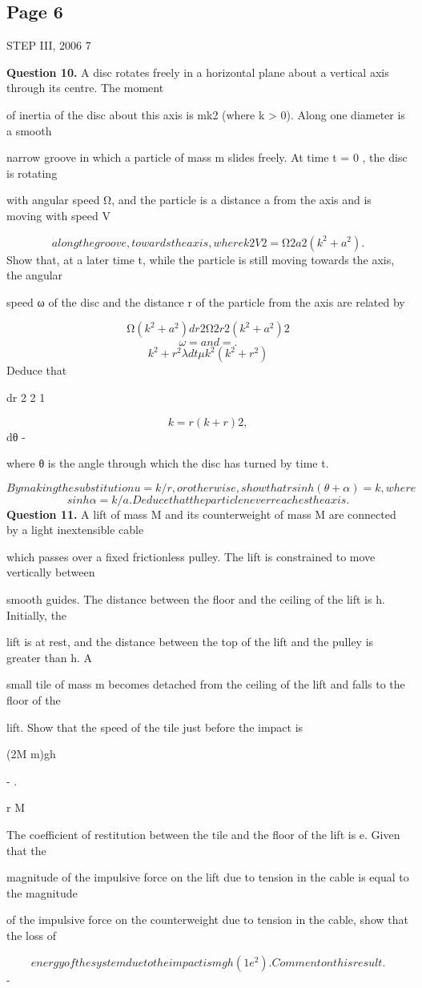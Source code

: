 \documentclass[12pt]{article}
\begin{document}
\subsection*{Page 6}
\begin{flushleft}
STEP III, 2006 7\par
\bigskip\textbf{Question 10.} A disc rotates freely in a horizontal plane about a vertical axis through its centre. The moment\par
of inertia of the disc about this axis is mk2 (where k > 0). Along one diameter is a smooth\par
narrow groove in which a particle of mass m slides freely. At time t = 0 , the disc is rotating\par
with angular speed Ω, and the particle is a distance a from the axis and is moving with speed V\par
\[along the groove, towards the axis, where k2V 2 = Ω2a2(k^2 + a^2) .\]
Show that, at a later time t, while the particle is still moving towards the axis, the angular\par
speed ω of the disc and the distance r of the particle from the axis are related by\par
\[Ω(k^2 + a^2) dr 2 Ω2r2(k^2 + a^2)2\]
\[ω = and = .\]
\[k^2 + r^2 \lambda dt \mu k^2(k^2 + r^2)\]
Deduce that\par
dr 2 2 1\par
\[k = r(k + r ) 2 ,\]
dθ -\par
where θ is the angle through which the disc has turned by time t.\par
\[By making the substitution u = k/r, or otherwise, show that r sinh(θ + α) = k, where\]
\[sinh α = k/a . Deduce that the particle never reaches the axis.\]
\bigskip\textbf{Question 11.} A lift of mass M and its counterweight of mass M are connected by a light inextensible cable\par
which passes over a fixed frictionless pulley. The lift is constrained to move vertically between\par
smooth guides. The distance between the floor and the ceiling of the lift is h. Initially, the\par
lift is at rest, and the distance between the top of the lift and the pulley is greater than h. A\par
small tile of mass m becomes detached from the ceiling of the lift and falls to the floor of the\par
lift. Show that the speed of the tile just before the impact is\par
(2M m)gh\par
- .\par
r M\par
The coefficient of restitution between the tile and the floor of the lift is e. Given that the\par
magnitude of the impulsive force on the lift due to tension in the cable is equal to the magnitude\par
of the impulsive force on the counterweight due to tension in the cable, show that the loss of\par
\[energy of the system due to the impact is mgh(1 e^2). Comment on this result.\]
-\par
\end{flushleft}
\end{document}
